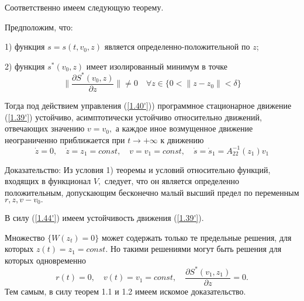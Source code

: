 Соответственно имеем следующую теорему.

\begin{theorem}\label{t-1.10}
Предположим, что:

1) функция $s = s(t, v_0, z)$ является определенно-положительной по $z$;

2) функция $s^{*} (v_0, z)$ имеет изолированный минимум в точке 
$$\| \frac{\partial S^{*} (v_0, z)}{\partial z} \| \ne 0 \quad \forall z \in \lbrace 0 < \| z - z_0 \| < \delta \rbrace$$

Тогда под действием управления (\ref{1.40'})) программное стационарное движение (\ref{1.39'}) устойчиво, асимптотически устойчиво относительно движений, отвечающих значению $v = v_0,$ а каждое иное возмущенное движение неограниченно приближается при $t \to + \infty$ к движению 
$$\dot z = 0, \quad \dot z = z_1 = const, \quad v = v_1 = const, \quad \dot s = \dot s_1 = A_{22}^{-1} (z_1) v_1$$
\end{theorem}

Доказательство:
Из условия 1) теоремы и условий относительно функций, входящих в функционал $V,$ следует, что он является определенно положительным, допускающим бесконечно малый высший предел по переменным $r, z, v - v_0.$

В силу (\ref{1.44'}) имеем устойчивость движения (\ref{1.39'}).

Множество $\lbrace W(z_t) = 0 \rbrace$ может содержать только те предельные решения, для которых $z(t) = z_1 = const.$ Но такими решениями могут быть решения для которых одновременно 
$$r(t) = 0, \quad v(t) = v_1 = const, \quad \frac{\partial S^{*} (v_1, z_1)}{\partial z} = 0.$$
Тем самым, в силу теорем 1.1 и 1.2 имеем искомое доказательство. 